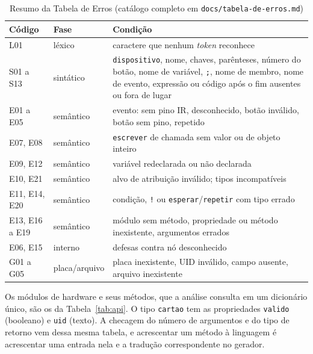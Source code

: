 \documentclass[conference]{IEEEtran}
\begin{document}
\begin{table}[htbp]
\caption{Resumo da Tabela de Erros (catálogo completo em \texttt{docs/tabela-de-erros.md})}
\begin{center}
\footnotesize
\setlength{\tabcolsep}{3pt}
\begin{tabular}{llp{4.6cm}}
\toprule
\textbf{Código} & \textbf{Fase} & \textbf{Condição} \\
\midrule
L01 & léxico & caractere que nenhum \textit{token} reconhece \\
S01 a S13 & sintático & \texttt{dispositivo}, nome, chaves, parênteses, número do botão, nome de variável, \texttt{;}, nome de membro, nome de evento, expressão ou código após o fim ausentes ou fora de lugar \\
E01 a E05 & semântico & evento: sem pino IR, desconhecido, botão inválido, botão sem pino, repetido \\
E07, E08 & semântico & \texttt{escrever} de chamada sem valor ou de objeto inteiro \\
E09, E12 & semântico & variável redeclarada ou não declarada \\
E10, E21 & semântico & alvo de atribuição inválido; tipos incompatíveis \\
E11, E14, E20 & semântico & condição, \texttt{!} ou \texttt{esperar}/\texttt{repetir} com tipo errado \\
E13, E16 a E19 & semântico & módulo sem método, propriedade ou método inexistente, argumentos errados \\
E06, E15 & interno & defesas contra nó desconhecido \\
G01 a G05 & placa/arquivo & placa inexistente, UID inválido, campo ausente, arquivo inexistente \\
\bottomrule
\end{tabular}
\label{tab:erros}
\end{center}
\end{table}

Os módulos de hardware e seus métodos, que a análise consulta em um
dicionário único, são os da Tabela~\ref{tab:api}. O tipo \texttt{cartao} tem
as propriedades \texttt{valido} (booleano) e \texttt{uid} (texto). A
checagem do número de argumentos e do tipo de retorno vem dessa mesma
tabela, e acrescentar um método à linguagem é acrescentar uma entrada nela e a
tradução correspondente no gerador.
\end{document}
